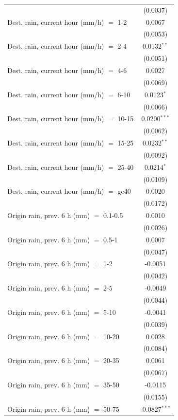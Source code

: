 \begin{tabular}{lc}
    & (0.0037)\\
   Dest. rain, current hour (mm/h) $=$ 1-2 & 0.0067\\
    & (0.0053)\\
   Dest. rain, current hour (mm/h) $=$ 2-4 & 0.0132$^{**}$\\
    & (0.0051)\\
   Dest. rain, current hour (mm/h) $=$ 4-6 & 0.0027\\
    & (0.0069)\\
   Dest. rain, current hour (mm/h) $=$ 6-10 & 0.0123$^{*}$\\
    & (0.0066)\\
   Dest. rain, current hour (mm/h) $=$ 10-15 & 0.0200$^{***}$\\
    & (0.0062)\\
   Dest. rain, current hour (mm/h) $=$ 15-25 & 0.0232$^{**}$\\
    & (0.0092)\\
   Dest. rain, current hour (mm/h) $=$ 25-40 & 0.0214$^{*}$\\
    & (0.0109)\\
   Dest. rain, current hour (mm/h) $=$ ge40 & 0.0020\\
    & (0.0172)\\
   Origin rain, prev. 6 h (mm) $=$ 0.1-0.5 & 0.0010\\
    & (0.0026)\\
   Origin rain, prev. 6 h (mm) $=$ 0.5-1 & 0.0007\\
    & (0.0047)\\
   Origin rain, prev. 6 h (mm) $=$ 1-2 & -0.0051\\
    & (0.0042)\\
   Origin rain, prev. 6 h (mm) $=$ 2-5 & -0.0049\\
    & (0.0044)\\
   Origin rain, prev. 6 h (mm) $=$ 5-10 & -0.0041\\
    & (0.0039)\\
   Origin rain, prev. 6 h (mm) $=$ 10-20 & 0.0028\\
    & (0.0084)\\
   Origin rain, prev. 6 h (mm) $=$ 20-35 & 0.0061\\
    & (0.0067)\\
   Origin rain, prev. 6 h (mm) $=$ 35-50 & -0.0115\\
    & (0.0155)\\
   Origin rain, prev. 6 h (mm) $=$ 50-75 & -0.0827$^{***}$\\

\end{tabular}
